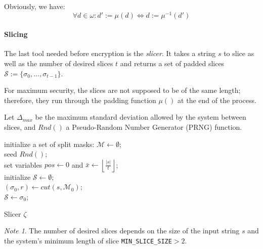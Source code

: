 \documentclass[twoside,twocolumn]{article}
\newcommand{\floor}[1]{\left\lfloor #1 \right\rfloor}
\theoremstyle{definition}
\theoremstyle{remark}
\newtheorem*{remark}{Note}
\begin{document}
Obviously, we have: $$\forall d \in \omega: d' := \mu(d) \iff d := \mu^{-1}(d')$$

\paragraph{Slicing}

The last tool needed before encryption is the \emph{slicer}. It takes a string $s$ to slice as well as the number of desired slices $t$ and returns a 
set of padded slices $\mathcal{S} := \{ \sigma_0, \dots, \sigma_{t-1} \}$.

For maximum security, the slices are not supposed to be of the same length; therefore, they run through the padding function $\mu()$ at the end of the 
process.

Let $\Delta_{max}$ be the maximum standard deviation allowed by the system between slices, and $Rnd()$ a Pseudo-Random Number Generator (PRNG) 
function\cite{PRNG}.
\begin{algorithm}
    initialize a set of split masks: $\mathcal{M} \gets \emptyset$; \\
    seed $Rnd()$; \\
    set variables $pos \gets 0$ and $\bar{x} \gets \floor{ \frac{|s|}{t} }$; \\
    initialize $\mathcal{S} \gets \emptyset$; \\
    $(\sigma_0, r) \gets cut(s, \mathcal{M}_0)$; \\
    $\mathcal{S} \gets \sigma_0$; \\
    \caption{Slicer $\zeta$}
    \label{algo:slicer}
\end{algorithm}

\begin{remark}
    The number of desired slices depends on the size of the input string $s$ and the system's minimum length of slice \texttt{MIN\_SLICE\_SIZE}$ > 2$.
\end{remark}
\end{document}
